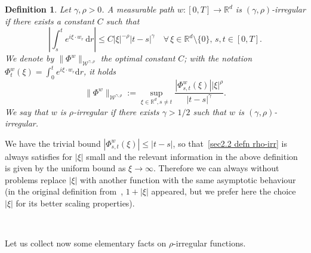 \documentclass[10pt]{article}
\newcommand{\assign}{:=}
\newcommand{\mathd}{\mathrm{d}}
\newcommand{\tmstrong}[1]{\textbf{#1}}
\newtheorem{definition}[theorem]{Definition}
\begin{document}
\begin{definition}
  \label{sec2.2 defn rho irregularity}Let $\gamma, \rho > 0$. A measurable
  path $w : [0, T] \rightarrow \mathbb{R}^d$ is $(\gamma,
  \rho)$\mbox{-}irregular{\tmstrong{}} if there exists a constant $C$ such
  that
  \begin{equation}
    \left| \int_s^t e^{i \xi \cdot w_r} \, \mathd r \right| \leqslant C | \xi
    |^{- \rho} | t - s |^{\gamma} \quad \forall \, \xi \in \mathbb{R}^d
    \setminus \{ 0 \}, \, s, t \in [0, T] . \label{sec2.2 defn rho-irr}
  \end{equation}
  We denote by $\| \Phi^w \|_{\mathcal{W}^{\gamma, \rho}}$ the optimal
  constant $C$; with the notation $\Phi^w_t (\xi) = \int_0^t e^{i \xi \cdot
  w_r} \mathd r$, it holds
  \[ \| \Phi^w \|_{\mathcal{W}^{\gamma, \rho}} \assign \sup_{\xi \in
     \mathbb{R}^d, s \neq t} \frac{| \Phi^w_{s, t} (\xi) | | \xi |^{\rho}}{| t
     - s |^{\gamma}} . \]
  We say that $w$ is $\rho$\mbox{-}irregular if there exists $\gamma > 1 / 2$
  such that $w$ is $(\gamma, \rho)$-irregular.
\end{definition}

We have the trivial bound $| \Phi^w_{s, t} (\xi) | \leqslant | t - s |$, so
that~{\eqref{sec2.2 defn rho-irr}} is always satisfies for $| \xi |$ small and
the relevant information in the above definition is given by the uniform bound
as $\xi \rightarrow \infty$. Therefore we can always without problems replace
$| \xi |$ with another function with the same asymptotic behaviour (in the
original definition from~{\cite{catelliergubinelli}}, $1 + | \xi |$ appeared,
but we prefer here the choice $| \xi |$ for its better scaling properties).

\

Let us collect now some elementary facts on $\rho$\mbox{-}irregular
functions.
\end{document}
